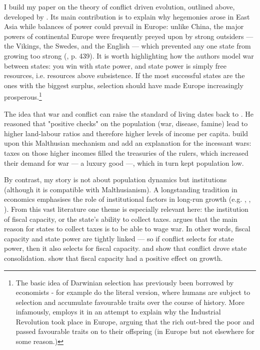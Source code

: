 \documentclass{article}
\begin{document}
I build my paper on the theory of conflict driven evolution, outlined above, developed by \cite{levine2013, levine2021, levine2022}. Its main contribution is to explain why hegemonies arose in East Asia while balances of power could prevail in Europe: unlike China, the major powers of continental Europe were frequently preyed upon by strong outsiders --- the Vikings, the Swedes, and the English --- which prevented any one state from growing too strong (\citealp{levine2021}, p. 439). It is worth highlighting how the authors model war between states: you win with state power, and state power is simply free resources, i.e. resources above subsistence. If the most successful states are the ones with the biggest surplus, selection should have made Europe increasingly prosperous.\footnote{The basic idea of Darwinian selection has previously been borrowed by economists - for example \cite{galor2002} do the literal version, where humans are subject to selection and accumulate favourable traits over the course of history. More infamously, \cite{clark2007} employs it in an attempt to explain why the Industrial Revolution took place in Europe, arguing that the rich out-bred the poor and passed favourable traits on to their offspring (in Europe but not elsewhere for some reason.)}

The idea that war and conflict can raise the standard of living dates back to \cite{malthus1798}. He reasoned that "positive checks" on the population (war, disease, famine) lead to higher land-labour ratios and therefore higher levels of income per capita. \cite{voigtlnder2013} build upon this Malthusian mechanism and add an explanation for the incessant wars: taxes on those higher incomes filled the treasuries of the rulers, which increased their demand for war --- a luxury good ---, which in turn kept population low. 

By contrast, my story is not about population dynamics but institutions (although it is compatible with Malthusianism). A longstanding tradition in economics emphasises the role of institutional factors in long-run growth (e.g. \cite{north1970}, \cite{delong1993}, \cite{ajr2001}). From this vast literature one theme is especially relevant here: the institution of fiscal capacity, or the state's ability to collect taxes. \cite{tilly1985} argues that the main reason for states to collect taxes is to be able to wage war. In other words, fiscal capacity and state power are tightly linked --- so if conflict selects for state power, then it also selects for fiscal capacity. \cite{gennaioli2015} and \cite{cantoni2023} show that conflict drove state consolidation. \cite{dincecco2012} show that fiscal capacity had a positive effect on growth.
\end{document}
